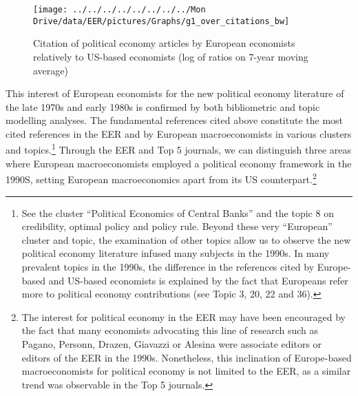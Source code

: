 \documentclass[
  12pt,
  onecolumn]{article}
\begin{document}
\begin{figure}[h]

{\centering \texttt{[image: ../../../../../../../../Mon Drive/data/EER/pictures/Graphs/g1\_over\_citations\_bw]} 

}

\caption{Citation of political economy articles by European economists relatively to US-based economists (log of ratios on 7-year moving average)}\label{fig:plot-political-economy-europe}
\end{figure}

This interest of European economists for the new political economy
literature of the late 1970s and early 1980s is confirmed by both
bibliometric and topic modelling analyses. The fundamental references
cited above constitute the most cited references in the EER and by
European macroeconomists in various clusters and topics.\footnote{See
  the cluster ``Political Economics of Central Banks'' and the topic 8
  on credibility, optimal policy and policy rule. Beyond these very
  ``European'' cluster and topic, the examination of other topics allow
  us to observe the new political economy literature infused many
  subjects in the 1990s. In many prevalent topics in the 1990s, the
  difference in the references cited by Europe-based and US-based
  economists is explained by the fact that Europeans refer more to
  political economy contributions (see Topic 3, 20, 22 and 36).} Through
the EER and Top 5 journals, we can distinguish three areas where
European macroeconomists employed a political economy framework in the
1990S, setting European macroeconomics apart from its US
counterpart.\footnote{The interest for political economy in the EER may
  have been encouraged by the fact that many economists advocating this
  line of research such as Pagano, Personn, Drazen, Giavazzi or Alesina
  were associate editors or editors of the EER in the 1990s.
  Nonetheless, this inclination of Europe-based macroeconomists for
  political economy is not limited to the EER, as a similar trend was
  observable in the Top 5 journals.}
\end{document}
